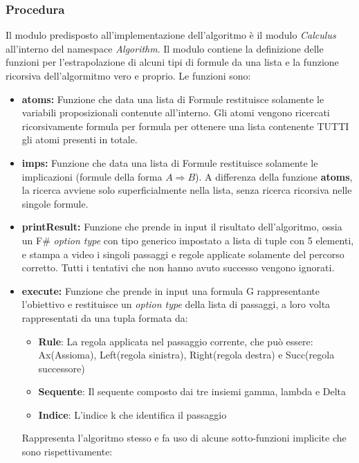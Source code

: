 \documentclass[\main/tesi.tex]{subfiles}
\begin{document}
\subsubsection{Procedura}
Il modulo predisposto all'implementazione dell'algoritmo è il modulo \textit{Calculus} all'interno del namespace \textit{Algorithm}. Il modulo contiene la definizione delle funzioni per l'estrapolazione di alcuni tipi di formule da una lista e la funzione ricorsiva dell'algormitmo vero e proprio. Le funzioni sono:
\begin{itemize}
    \item \textbf{atoms:} Funzione che data una lista di Formule restituisce solamente le variabili proposizionali contenute all'interno. Gli atomi vengono ricercati ricorsivamente formula per formula per ottenere una lista contenente TUTTI gli atomi presenti in totale.
    \item \textbf{imps:} Funzione che data una lista di Formule restituisce solamente le implicazioni (formule della forma $A \Rightarrow B$). A differenza della funzione \textbf{atoms}, la ricerca avviene solo superficialmente nella lista, senza ricerca ricorsiva nelle singole formule.
    \item \textbf{printResult:} Funzione che prende in input il risultato dell'algoritmo, ossia un F\# \cite{fsharp} \textit{option type} con tipo generico impostato a lista di tuple con 5 elementi, e stampa a video i singoli passaggi e regole applicate solamente del percorso corretto. Tutti i tentativi che non hanno avuto successo vengono ignorati.
    \item \textbf{execute:} Funzione che prende in input una formula G rappresentante l'obiettivo e restituisce un \textit{option type} della lista di passaggi, a loro volta rappresentati da una tupla formata da:
          \begin{itemize}
              \item \textbf{Rule}: La regola applicata nel passaggio corrente, che può essere: Ax(Assioma), Left(regola sinistra), Right(regola destra) e Succ(regola successore)
              \item \textbf{Sequente}: Il sequente composto dai tre insiemi gamma, lambda e Delta
              \item \textbf{Indice}: L'indice k che identifica il passaggio
          \end{itemize}
          Rappresenta l'algoritmo stesso e fa uso di alcune sotto-funzioni implicite che sono rispettivamente:
          \begin{itemize}

\end{itemize}
\end{itemize}
\end{document}
